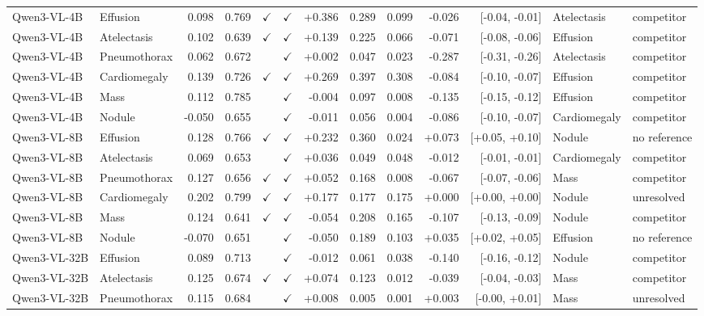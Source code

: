\begin{longtable}{llrrccrrrrrll}
Qwen3-VL-4B & Effusion & 0.098 & 0.769 & $\checkmark$ & $\checkmark$ & +0.386 & 0.289 & 0.099 & -0.026 & [-0.04, -0.01] & Atelectasis & competitor \\
Qwen3-VL-4B & Atelectasis & 0.102 & 0.639 & $\checkmark$ & $\checkmark$ & +0.139 & 0.225 & 0.066 & -0.071 & [-0.08, -0.06] & Effusion & competitor \\
Qwen3-VL-4B & Pneumothorax & 0.062 & 0.672 &  & $\checkmark$ & +0.002 & 0.047 & 0.023 & -0.287 & [-0.31, -0.26] & Atelectasis & competitor \\
Qwen3-VL-4B & Cardiomegaly & 0.139 & 0.726 & $\checkmark$ & $\checkmark$ & +0.269 & 0.397 & 0.308 & -0.084 & [-0.10, -0.07] & Effusion & competitor \\
Qwen3-VL-4B & Mass & 0.112 & 0.785 &  & $\checkmark$ & -0.004 & 0.097 & 0.008 & -0.135 & [-0.15, -0.12] & Effusion & competitor \\
Qwen3-VL-4B & Nodule & -0.050 & 0.655 &  & $\checkmark$ & -0.011 & 0.056 & 0.004 & -0.086 & [-0.10, -0.07] & Cardiomegaly & competitor \\
Qwen3-VL-8B & Effusion & 0.128 & 0.766 & $\checkmark$ & $\checkmark$ & +0.232 & 0.360 & 0.024 & +0.073 & [+0.05, +0.10] & Nodule & no reference \\
Qwen3-VL-8B & Atelectasis & 0.069 & 0.653 &  & $\checkmark$ & +0.036 & 0.049 & 0.048 & -0.012 & [-0.01, -0.01] & Cardiomegaly & competitor \\
Qwen3-VL-8B & Pneumothorax & 0.127 & 0.656 & $\checkmark$ & $\checkmark$ & +0.052 & 0.168 & 0.008 & -0.067 & [-0.07, -0.06] & Mass & competitor \\
Qwen3-VL-8B & Cardiomegaly & 0.202 & 0.799 & $\checkmark$ & $\checkmark$ & +0.177 & 0.177 & 0.175 & +0.000 & [+0.00, +0.00] & Nodule & unresolved \\
Qwen3-VL-8B & Mass & 0.124 & 0.641 & $\checkmark$ & $\checkmark$ & -0.054 & 0.208 & 0.165 & -0.107 & [-0.13, -0.09] & Nodule & competitor \\
Qwen3-VL-8B & Nodule & -0.070 & 0.651 &  & $\checkmark$ & -0.050 & 0.189 & 0.103 & +0.035 & [+0.02, +0.05] & Effusion & no reference \\
Qwen3-VL-32B & Effusion & 0.089 & 0.713 &  & $\checkmark$ & -0.012 & 0.061 & 0.038 & -0.140 & [-0.16, -0.12] & Nodule & competitor \\
Qwen3-VL-32B & Atelectasis & 0.125 & 0.674 & $\checkmark$ & $\checkmark$ & +0.074 & 0.123 & 0.012 & -0.039 & [-0.04, -0.03] & Mass & competitor \\
Qwen3-VL-32B & Pneumothorax & 0.115 & 0.684 &  & $\checkmark$ & +0.008 & 0.005 & 0.001 & +0.003 & [-0.00, +0.01] & Mass & unresolved \\

\end{longtable}
